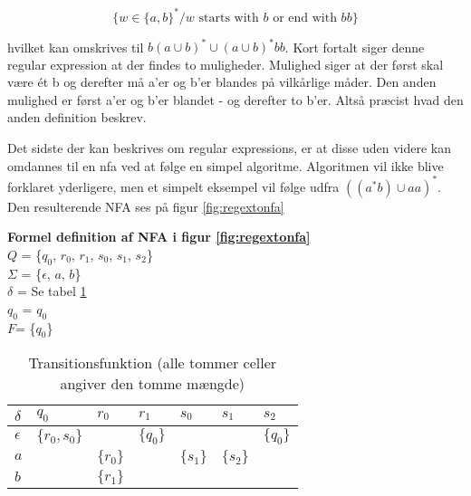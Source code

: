 $$ \{w \in \{a, b\}^* / w \text{ starts with }b \text{ or end with }bb\} $$

\noindent hvilket kan omskrives til $b(a \cup b)^* \cup (a \cup b)^* bb$. Kort fortalt siger denne regular expression at der findes to muligheder. Mulighed siger at der først skal være ét b og derefter må a'er og b'er blandes på vilkårlige måder. Den anden mulighed er først a'er og b'er blandet - og derefter to b'er. Altså præcist hvad den anden definition beskrev.

Det sidste der kan beskrives om regular expressions, er at disse uden videre kan omdannes til en \gls{nfa} ved at følge en simpel algoritme. Algoritmen vil ikke blive forklaret yderligere, men et simpelt eksempel vil følge udfra $((a^*b) \cup aa)^*$. Den resulterende NFA ses på figur \ref{fig:regextonfa}


\noindent \textbf{Formel definition af NFA i figur \ref{fig:regextonfa}}\\
\noindent $Q$ = \{$q_0$, $r_0$, $r_1$, $s_0$, $s_1$, $s_2$\}\\
\noindent $\Sigma$ = \{$\epsilon$, $a$, $b$\}\\
\noindent $\delta$ = Se tabel \ref{tab:regextonfa}\\
\noindent $q_0$ = $q_0$\\
\noindent $F$= \{$q_0$\}\\

\begin{table}[H]
\centering
\footnotesize
{}
\begin{tabular}{l@{\hskip\tabcolsep\vrule width 1pt\hskip\tabcolsep}l|l|l|l|l|l}

$\delta$   & $q_0$          & $r_0$     & $r_1$     & $s_0$     & $s_1$     & $s_2$ \\ \bottomrule
$\epsilon$ & $\{r_0, s_0\}$ &           & $\{q_0\}$ &           &           & $\{q_0\}$ \\
$a$        &                & $\{r_0\}$ &           & $\{s_1\}$ & $\{s_2\}$ &       \\
$b$        &                & $\{r_1\}$ &           &           &           &

\end{tabular}
	\caption{Transitionsfunktion (alle tommer celler angiver den tomme mængde)}
    \label{tab:regextonfa}
\end{table}


